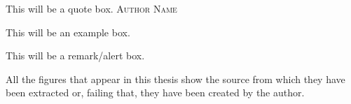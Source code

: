 \begin{quoteBox}
  This will be a quote box.
  \tcblower\textsc{Author Name}
\end{quoteBox}

\begin{exampleBox}
  This will be an example box.
\end{exampleBox}

\begin{remarkBox}
  This will be a remark/alert box.
\end{remarkBox}

All the figures that appear in this thesis show the source from which they have
been extracted or, failing that, they have been created by the author.
